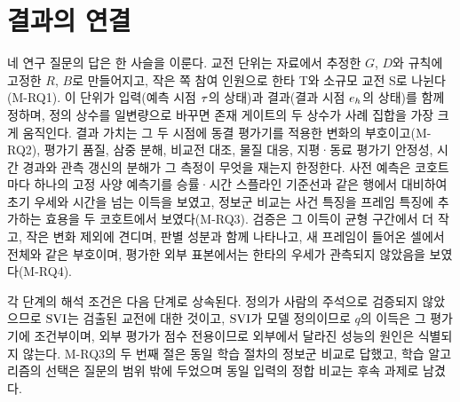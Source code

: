 \section{결과의 연결}
\label{sec:disc-chain}

네 연구 질문의 답은 한 사슬을 이룬다. 교전 단위는 자료에서 추정한 $G$, $D$와 규칙에 고정한 $R$, $B$로 만들어지고, 작은 쪽 참여 인원으로 한타 T와 소규모 교전 S로 나뉜다(M-RQ1). 이 단위가 입력(예측 시점 $\tau$의 상태)과 결과(결과 시점 $e_{h}$의 상태)를 함께 정하며, 정의 상수를 일변량으로 바꾸면 존재 게이트의 두 상수가 사례 집합을 가장 크게 움직인다. 결과 가치는 그 두 시점에 동결 평가기를 적용한 변화의 부호이고(M-RQ2), 평가기 품질, 삼중 분해, 비교전 대조, 물질 대응, 지평·동료 평가기 안정성, 시간 경과와 관측 갱신의 분해가 그 측정이 무엇을 재는지 한정한다. 사전 예측은 코호트마다 하나의 고정 사양 예측기를 승률·시간 스플라인 기준선과 같은 행에서 대비하여 초기 우세와 시간을 넘는 이득을 보였고, 정보군 비교는 사건 특징을 프레임 특징에 추가하는 효용을 두 코호트에서 보였다(M-RQ3). 검증은 그 이득이 균형 구간에서 더 작고, 작은 변화 제외에 견디며, 판별 성분과 함께 나타나고, 새 프레임이 들어온 셀에서 전체와 같은 부호이며, 평가한 외부 표본에서는 한타의 우세가 관측되지 않았음을 보였다(M-RQ4).

각 단계의 해석 조건은 다음 단계로 상속된다. 정의가 사람의 주석으로 검증되지 않았으므로 $\mathrm{SVI}$는 검출된 교전에 대한 것이고, $\mathrm{SVI}$가 모델 정의이므로 $q$의 이득은 그 평가기에 조건부이며, 외부 평가가 점수 전용이므로 외부에서 달라진 성능의 원인은 식별되지 않는다. M-RQ3의 두 번째 절은 동일 학습 절차의 정보군 비교로 답했고, 학습 알고리즘의 선택은 질문의 범위 밖에 두었으며 동일 입력의 정합 비교는 후속 과제로 남겼다.
